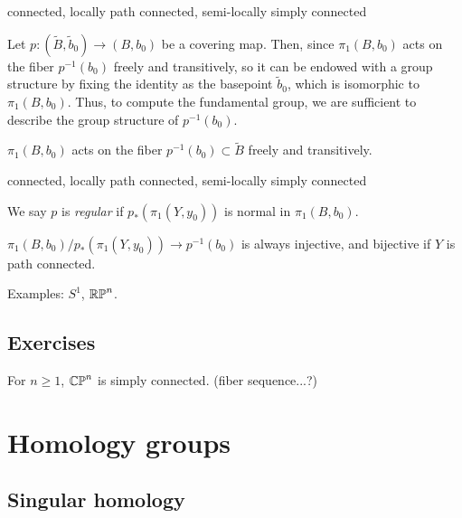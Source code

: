 \documentclass{../../large}
\begin{document}
\begin{prb}
connected, locally path connected, semi-locally simply connected


Let $p:(\tilde B,\tilde b_0)\to(B,b_0)$ be a covering map.
Then, since $\pi_1(B,b_0)$ acts on the fiber $p^{-1}(b_0)$ freely and transitively, so it can be endowed with a group structure by fixing the identity as the basepoint $\tilde b_0$, which is isomorphic to $\pi_1(B,b_0)$.
Thus, to compute the fundamental group, we are sufficient to describe the group structure of $p^{-1}(b_0)$.

\begin{parts}
\item $\pi_1(B,b_0)$ acts on the fiber $p^{-1}(b_0)\subset\tilde B$ freely and transitively.
\end{parts}
\end{prb}
\begin{pf}

\end{pf}


\begin{prb}
connected, locally path connected, semi-locally simply connected

We say $p$ is \emph{regular} if $p_*(\pi_1(Y,y_0))$ is normal in $\pi_1(B,b_0)$.

$\pi_1(B,b_0)/p_*(\pi_1(Y,y_0))\to p^{-1}(b_0)$ is always injective, and bijective if $Y$ is path connected.
\end{prb}


Examples: $S^1$, $\mathbb{RP}^n$.


\section*{Exercises}

\begin{prb}
For $n\ge1$, $\mathbb{CP}^n$ is simply connected. (fiber sequence...?)
\end{prb}




\chapter{Homology groups}
\section{Singular homology}

\begin{prb}
\end{prb}
\end{document}

